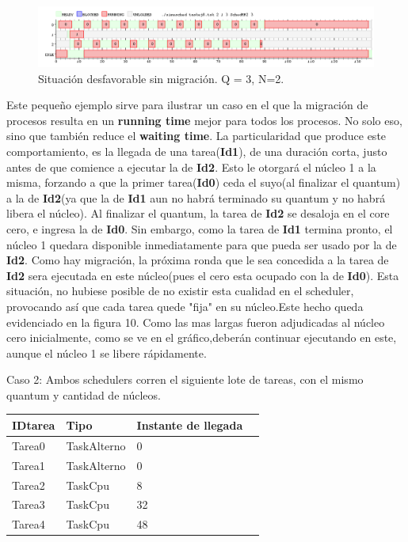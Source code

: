 \documentclass[10pt, a4paper]{article}
\begin{document}
\begin{figure}[H]
  	\centering
   	\includegraphics[width=1\textwidth]
   	 {imgs/8NoMigracion1.png}
	\caption{Situación desfavorable sin migración. Q = 3, N=2.}
\end{figure}



Este pequeño ejemplo sirve para ilustrar un caso en el que la migración de procesos resulta en un \textbf{running time} mejor para todos los procesos. 
No solo eso, sino que también reduce el \textbf{waiting time}. La particularidad que produce este comportamiento, es la llegada de una tarea(\textbf{Id1}), de una duración corta, justo antes de que comience a ejecutar la de \textbf{Id2}. Esto le otorgará el núcleo 1 a la misma,
forzando a que la primer tarea(\textbf{Id0}) ceda el suyo(al finalizar el quantum) a la de \textbf{Id2}(ya que la de \textbf{Id1} aun no habrá terminado su quantum y no habrá libera el núcleo). Al finalizar el quantum, la tarea de \textbf{Id2} se desaloja en el core cero, e ingresa la de \textbf{Id0}. Sin embargo, como la tarea de \textbf{Id1} termina pronto, el núcleo 1 quedara disponible inmediatamente para que pueda ser usado por la de \textbf{Id2}.
Como hay migración, la próxima ronda que le sea concedida a la tarea de \textbf{Id2} sera ejecutada en este núcleo(pues el cero esta ocupado con la de \textbf{Id0}). Esta situación, no hubiese
posible de no existir esta cualidad en el scheduler, provocando así que cada tarea quede "fija"  en su núcleo.Este hecho queda evidenciado en la figura 10. 
Como las mas largas fueron adjudicadas al núcleo cero inicialmente, como se ve en el gráfico,deberán continuar ejecutando en este, aunque el núcleo 1 se libere rápidamente.


Caso 2: Ambos schedulers corren el siguiente lote de tareas, con el mismo quantum y cantidad de núcleos.

\begin{center}
\begin{tabular}{| l | l | l | l |}
    \hline
    IDtarea &  Tipo & Instante de llegada\\ \hline
    Tarea0 & 	TaskAlterno & 0 \\ \hline
    Tarea1 &	TaskAlterno & 0 \\ \hline
    Tarea2 &	TaskCpu & 8\\ \hline
    Tarea3 &	TaskCpu & 32 \\ \hline
    Tarea4 &	TaskCpu & 48 \\ \hline
   
\end{tabular}
\end{center}
\end{document}
